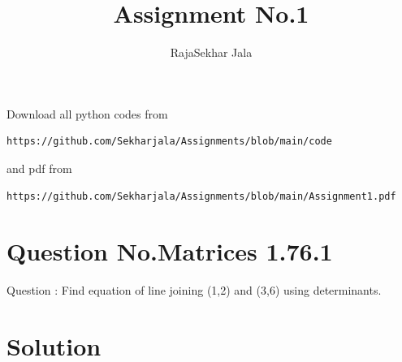\documentclass[journal,12pt,twocolumn]{IEEEtran}
\begin{document}
\makeatother
\let\StandardTheFigure\thefigure
\let\vec\mathbf
\renewcommand{\thefigure}{\theproblem}
\def\putbox#1#2#3{\makebox[0in][l]{\makebox[#1][l]{}\raisebox{\baselineskip}[0in][0in]{\raisebox{#2}[0in][0in]{#3}}}}
     \def\rightbox#1{\makebox[0in][r]{#1}}
     \def\centbox#1{\makebox[0in]{#1}}
     \def\topbox#1{\raisebox{-\baselineskip}[0in][0in]{#1}}
     \def\midbox#1{\raisebox{-0.5\baselineskip}[0in][0in]{#1}}
\vspace{3cm}
\title{Assignment No.1}
\author{RajaSekhar Jala}
\maketitle
\newpage
\bigskip
\renewcommand{\thefigure}{\theenumi}
\renewcommand{\thetable}{\theenumi}
Download all python codes from 
\begin{lstlisting}
https://github.com/Sekharjala/Assignments/blob/main/code
\end{lstlisting}
%
and pdf from 
%
\begin{lstlisting}
https://github.com/Sekharjala/Assignments/blob/main/Assignment1.pdf
\end{lstlisting}
%
\section{Question No.Matrices 1.76.1}

Question :
Find equation of line joining (1,2) and
(3,6) using determinants.
\section{Solution}
\end{document}
